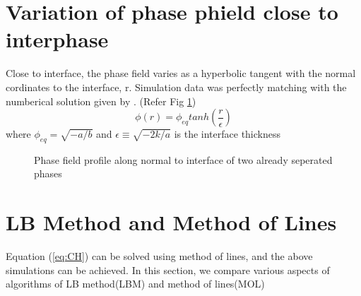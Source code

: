 \documentclass[a0,portrait]{a0poster}
\begin{document}
\begin{multicols}{3}
\section{Variation of phase phield close to interphase}
Close to interface, the phase field varies as a hyperbolic tangent with the normal cordinates to the interface, r. Simulation data was perfectly matching with the numberical solution given by \cite{arXiv:1104.0078}. (Refer Fig \ref*{fig:tanh}) \newline
\begin{equation}
\phi(r) = \phi_{eq}tan h(\frac{r}{\epsilon})
\end{equation}
where $\phi_{eq} = \sqrt{-a/b}$ and $\epsilon \equiv \sqrt{-2k/a}$ is the interface thickness
\begin{figure}[H]
	\begin{center}
		\caption{Phase field profile along normal to interface of two already seperated phases }
		\label{fig:tanh}
	\end{center}
	
\end{figure}

\section{LB Method and Method of Lines}
Equation (\ref{eq:CH}) can be solved using method of lines, and the above simulations can be achieved. In this section, we compare various aspects of algorithms of LB method(LBM) and method of lines(MOL)

\end{multicols}
\end{document}
